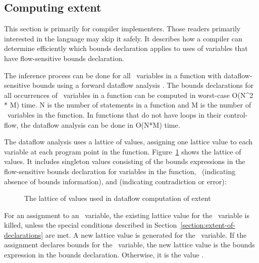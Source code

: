 \subsection{Computing extent}
\label{section:computing-extent}

This section is primarily for compiler implementers. Those readers
primarily interested in the language may skip it safely. It describes
how a compiler can determine efficiently which bounds declaration
applies to uses of variables that have flow-sensitive bounds
declaration.

The inference process can be done for all \arrayptr\ variables
in a function with dataflow-sensitive bounds using a forward dataflow
analysis \cite{Aho2007}. The bounds declarations for all occurrences of
\arrayptr\ variables in a function can be computed in
worst-case O(N\^{}2 * M) time. N is the number of statements in a
function and M is the number of \arrayptr\ variables in the
function. In functions that do not have loops in their control-flow, the
dataflow analysis can be done in O(N*M) time.

The dataflow analysis uses a lattice of values, assigning one lattice
value to each variable at each program point in the function.
Figure~\ref{fig:extent-dataflow-lattice} shows the lattice of values.
It includes singleton values consisting of the bounds
expressions in the flow-sensitive bounds declaration for variables in
the function, \boundsunknown\ (indicating absence of bounds
information), and  (indicating contradiction or error):

\begin{figure}
\begin{center}
\end{center}
\caption{The lattice of values used in dataflow computation of extent}
\label{fig:extent-dataflow-lattice}
\end{figure}

For an assignment to an \arrayptr\ variable, the existing
lattice value for the \arrayptr\ variable is killed, unless
the special conditions described in Section~\ref{section:extent-of-declarations}
are met.
A new lattice value is generated for the \arrayptr\ variable. If the
assignment declares bounds for the \arrayptr\ variable, the new
lattice value is the bounds expression in the bounds declaration.
Otherwise, it is the value \boundsunknown.


